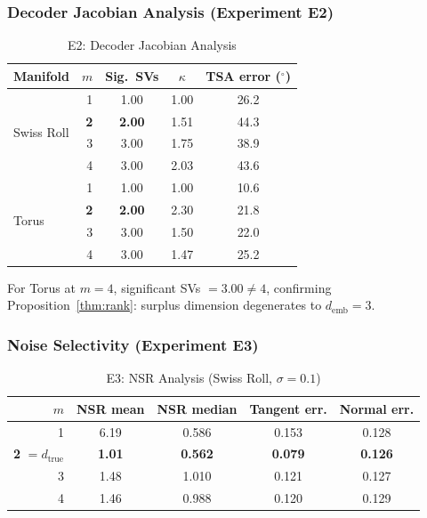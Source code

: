 \documentclass[12pt,a4paper]{article}
\newcommand{\dtrue}{d_{\mathrm{true}}}
\newcommand{\kap}{\kappa}
\newcommand{\demb}{d_{\mathrm{emb}}}
\begin{document}
\subsubsection{Decoder Jacobian Analysis (Experiment E2)}

\begin{table}[H]
\centering
\caption{E2: Decoder Jacobian Analysis}
\label{tab:e2}
\begin{tabular}{lrccc}
\toprule
Manifold & $m$ & Sig.\ SVs & $\kap$ & TSA error ($^\circ$) \\
\midrule
\multirow{4}{*}{Swiss Roll} & 1 & 1.00 & 1.00 & 26.2 \\
 & \textbf{2} & \textbf{2.00} & 1.51 & 44.3 \\
 & 3 & 3.00 & 1.75 & 38.9 \\
 & 4 & 3.00 & 2.03 & 43.6 \\
\midrule
\multirow{4}{*}{Torus} & 1 & 1.00 & 1.00 & 10.6 \\
 & \textbf{2} & \textbf{2.00} & 2.30 & 21.8 \\
 & 3 & 3.00 & 1.50 & 22.0 \\
 & 4 & 3.00 & 1.47 & 25.2 \\
\bottomrule
\end{tabular}
\end{table}

For Torus at $m=4$, significant SVs $= 3.00 \neq 4$, confirming Proposition~\ref{thm:rank}: surplus dimension degenerates to $\demb = 3$.

\subsubsection{Noise Selectivity (Experiment E3)}

\begin{table}[H]
\centering
\caption{E3: NSR Analysis (Swiss Roll, $\sigma=0.1$)}
\label{tab:e3}
\begin{tabular}{rcccc}
\toprule
$m$ & NSR mean & NSR median & Tangent err. & Normal err. \\
\midrule
1 & 6.19 & 0.586 & 0.153 & 0.128 \\
\textbf{2} $= \dtrue$ & \textbf{1.01} & \textbf{0.562} & \textbf{0.079} & \textbf{0.126} \\
3 & 1.48 & 1.010 & 0.121 & 0.127 \\
4 & 1.46 & 0.988 & 0.120 & 0.129 \\
\bottomrule
\end{tabular}
\end{table}
\end{document}
